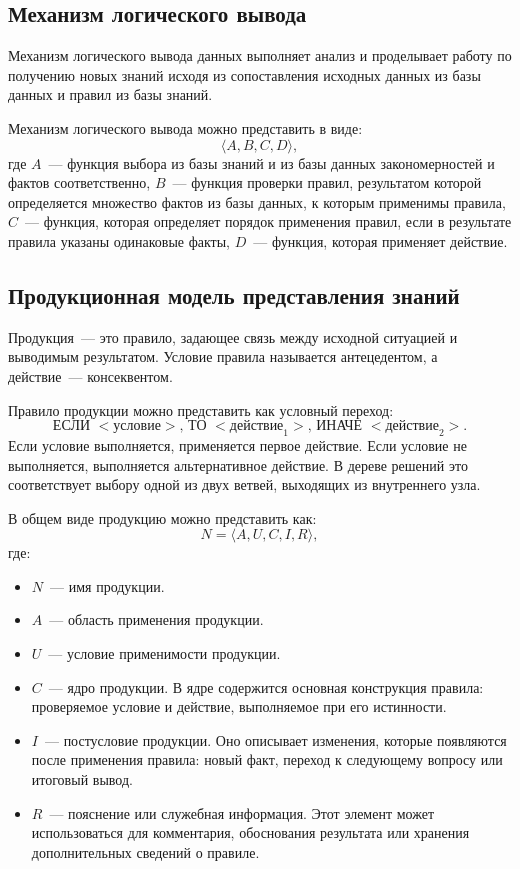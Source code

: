 \subsection{Механизм логического вывода}

Механизм логического вывода данных выполняет анализ и проделывает работу по получению новых знаний исходя из сопоставления исходных данных из базы данных и правил из базы знаний.

Механизм логического вывода можно представить в виде:
\[
    \langle A, B, C, D \rangle,
\]
где $A$~--- функция выбора из базы знаний и из базы данных закономерностей и фактов соответственно, $B$~--- функция проверки правил, результатом которой определяется множество фактов из базы данных, к которым применимы правила, $C$~--- функция, которая определяет порядок применения правил, если в результате правила указаны одинаковые факты, $D$~--- функция, которая применяет действие.

\subsection{Продукционная модель представления знаний}

Продукция~--- это правило, задающее связь между исходной ситуацией и выводимым результатом. Условие правила называется антецедентом, а действие~--- консеквентом.

Правило продукции можно представить как условный переход:
\[
    \text{ЕСЛИ } <\text{условие}> \text{, ТО } <\text{действие}_1> \text{, ИНАЧЕ } <\text{действие}_2>.
\]
Если условие выполняется, применяется первое действие. Если условие не выполняется, выполняется альтернативное действие. В дереве решений это соответствует выбору одной из двух ветвей, выходящих из внутреннего узла.

В общем виде продукцию можно представить как:
\[
    N = \langle A, U, C, I, R \rangle,
\]
где:
\begin{itemize}
    \item $N$~--- имя продукции.
    \item $A$~--- область применения продукции.
    \item $U$~--- условие применимости продукции.
    \item $C$~--- ядро продукции. В ядре содержится основная конструкция правила: проверяемое условие и действие, выполняемое при его истинности.
    \item $I$~--- постусловие продукции. Оно описывает изменения, которые появляются после применения правила: новый факт, переход к следующему вопросу или итоговый вывод.
    \item $R$~--- пояснение или служебная информация. Этот элемент может использоваться для комментария, обоснования результата или хранения дополнительных сведений о правиле.
\end{itemize}

